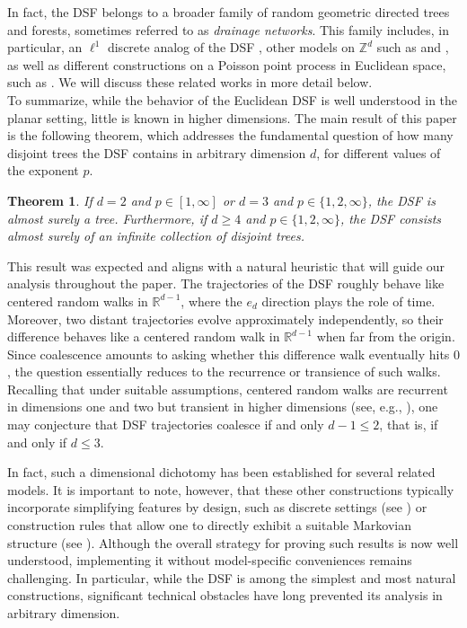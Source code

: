 \documentclass[a4paper, 11pt]{article}
\theoremstyle{plain}
\newtheorem{Theorem}{Theorem}[section]
\theoremstyle{definition}
\newcommand{\Z}{\mathbb{Z}}
\numberwithin{equation}{section}
\begin{document}
In fact, the DSF belongs to a broader family of random geometric directed trees and forests, sometimes referred to as \emph{drainage networks}. This family includes, in particular, an $\ell^1$ discrete analog of the DSF \cite{DiscreteDsf}, other models on $\Z^d$ such as \cite{gangopadhyay2004random} and \cite{athreya2008random}, as well as different constructions on a Poisson point process in Euclidean space, such as \cite{Ferrari2004}. We will discuss these related works in more detail below.\\

To summarize, while the behavior of the Euclidean DSF is well understood in the planar setting, little is known in higher dimensions. The main result of this paper is the following theorem, which addresses the fundamental question of how many disjoint trees the DSF contains in arbitrary dimension $d$, for different values of the exponent $p$.


\begin{Theorem}
    \label{thm_main}
    If $d=2$ and $p\in[1, \infty]$ or $d=3$ and $p\in\{1, 2, \infty\}$, the DSF is almost surely a tree. Furthermore, if $d\geq 4$ and $p\in\{1, 2, \infty\}$, the DSF consists almost surely of an infinite collection of disjoint trees.
\end{Theorem}


This result was expected and aligns with a natural heuristic that will guide our analysis throughout the paper. The trajectories of the DSF roughly behave like centered random walks in $\mathbb{R}^{d-1}$, where the $e_d$ direction plays the role of time. Moreover, two distant trajectories evolve approximately independently, so their difference behaves like a centered random walk in $\mathbb{R}^{d-1}$ when far from the origin. Since coalescence amounts to asking whether this difference walk eventually hits $0$, the question essentially reduces to the recurrence or transience of such walks. Recalling that under suitable assumptions, centered random walks are recurrent in dimensions one and two but transient in higher dimensions (see, e.g., \cite[Chapter~4]{Durett}), one may conjecture that DSF trajectories coalesce if and only $d-1\leq2$, that is, if and only if $d\leq3$.

In fact, such a dimensional dichotomy has been established for several related models. It is important to note, however, that these other constructions typically incorporate simplifying features by design, such as discrete settings (see \cite{gangopadhyay2004random, athreya2008random, DiscreteDsf}) or construction rules that allow one to directly exhibit a suitable Markovian structure (see \cite{Ferrari2004}). Although the overall strategy for proving such results is now well understood, implementing it without model-specific conveniences remains challenging. In particular, while the DSF is among the simplest and most natural constructions, significant technical obstacles have long prevented its analysis in arbitrary dimension.
\end{document}
